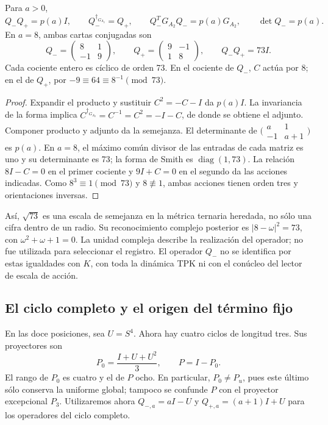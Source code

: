 \begin{proposition}
\label{lib02:norma-A2}
Para \(a>0\),
\[
 Q_-Q_+=p(a)I,\qquad Q_-^{\dagger_{G_{A_2}}}=Q_+,
 \qquad Q_-^TG_{A_2}Q_-=p(a)G_{A_2},\qquad \det Q_-=p(a).
\]
En \(a=8\), ambas cartas conjugadas son
\[
 Q_-=
 \begin{pmatrix}8&1\\-1&9\end{pmatrix},\qquad
 Q_+=\begin{pmatrix}9&-1\\1&8\end{pmatrix},\qquad Q_-Q_+=73I.
\]
Cada cociente entero es cíclico de orden 73. En el cociente de \(Q_-\),
\(C\) actúa por \(8\); en el de \(Q_+\), por
\(-9\equiv64\equiv8^{-1}\pmod{73}\).
\end{proposition}
\begin{proof}
Expandir el producto y sustituir \(C^2=-C-I\) da \(p(a)I\).
La invariancia de la forma implica
\(C^{\dagger_{G_{A_2}}}=C^{-1}=C^2=-I-C\), de donde se obtiene
el adjunto. Componer producto y adjunto da la semejanza. El determinante
de \(\bigl(\begin{smallmatrix}a&1\\-1&a+1\end{smallmatrix}\bigr)\)
es \(p(a)\). En \(a=8\), el máximo común divisor de las entradas
de cada matriz es uno y su determinante es 73; la forma de Smith es
\(\operatorname{diag}(1,73)\). La relación \(8I-C=0\) en el
primer cociente y \(9I+C=0\) en el segundo da las acciones indicadas.
Como \(8^3\equiv1\pmod{73}\) y \(8\not\equiv1\), ambas
acciones tienen orden tres y orientaciones inversas.
\end{proof}

Así, \(\sqrt{73}\) es una escala de semejanza en la métrica ternaria
heredada, no sólo una cifra dentro de un radio. Su reconocimiento complejo
posterior es \(|8-\omega|^2=73\), con
\(\omega^2+\omega+1=0\). La unidad compleja describe la realización
del operador; no fue utilizada para seleccionar el registro. El operador
\(Q_-\) no se identifica por estas igualdades con \(K\), con toda
la dinámica TPK ni con el conúcleo del lector de escala de acción.

\subsection{El ciclo completo y el origen del término fijo}
\label{lib02:ciclo-completo}

En las doce posiciones, sea \(U=S^4\). Ahora hay cuatro ciclos de
longitud tres. Sus proyectores son
\[
 P_0=\frac{I+U+U^2}{3},\qquad P=I-P_0.
\]
El rango de \(P_0\) es cuatro y el de \(P\) ocho. En particular,
\(P_0\ne P_u\), pues este último sólo conserva la uniforme global;
tampoco se confunde \(P\) con el proyector excepcional \(P_3\).
Utilizaremos ahora \(Q_{-,a}=aI-U\) y \(Q_{+,a}=(a+1)I+U\)
para los operadores del ciclo completo.

